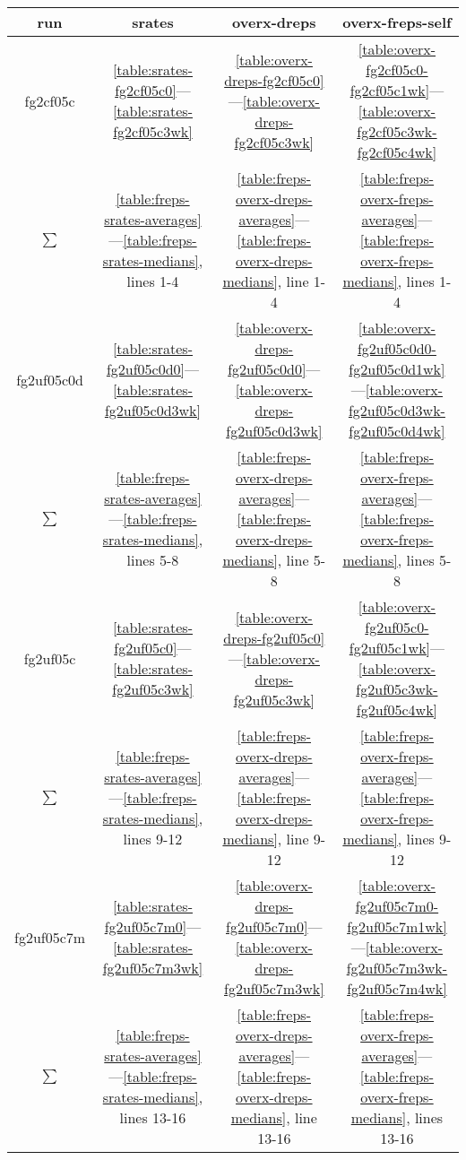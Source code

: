 \documentclass[10pt,oneside]{memoir}
\begin{document}
\begin{table}
\begin{tabular}{|cccc|}
\toprule
run & srates & overx-dreps & overx-freps-self  \\
\midrule
fg2cf05c & \ref{table:srates-fg2cf05c0}—\ref{table:srates-fg2cf05c3wk} & \ref{table:overx-dreps-fg2cf05c0}—\ref{table:overx-dreps-fg2cf05c3wk} & \ref{table:overx-fg2cf05c0-fg2cf05c1wk}—\ref{table:overx-fg2cf05c3wk-fg2cf05c4wk} \\
$\sum$ & \ref{table:freps-srates-averages}—\ref{table:freps-srates-medians}, lines 1-4 & \ref{table:freps-overx-dreps-averages}—\ref{table:freps-overx-dreps-medians}, line 1-4 & \ref{table:freps-overx-freps-averages}—\ref{table:freps-overx-freps-medians}, lines 1-4  \\
\hline
fg2uf05c0d & \ref{table:srates-fg2uf05c0d0}—\ref{table:srates-fg2uf05c0d3wk} & \ref{table:overx-dreps-fg2uf05c0d0}—\ref{table:overx-dreps-fg2uf05c0d3wk} & \ref{table:overx-fg2uf05c0d0-fg2uf05c0d1wk}—\ref{table:overx-fg2uf05c0d3wk-fg2uf05c0d4wk} \\
$\sum$ & \ref{table:freps-srates-averages}—\ref{table:freps-srates-medians}, lines 5-8 & \ref{table:freps-overx-dreps-averages}—\ref{table:freps-overx-dreps-medians}, line 5-8 & \ref{table:freps-overx-freps-averages}—\ref{table:freps-overx-freps-medians}, lines 5-8  \\
\hline
fg2uf05c & \ref{table:srates-fg2uf05c0}—\ref{table:srates-fg2uf05c3wk} & \ref{table:overx-dreps-fg2uf05c0}—\ref{table:overx-dreps-fg2uf05c3wk} & \ref{table:overx-fg2uf05c0-fg2uf05c1wk}—\ref{table:overx-fg2uf05c3wk-fg2uf05c4wk} \\
$\sum$ & \ref{table:freps-srates-averages}—\ref{table:freps-srates-medians}, lines 9-12 & \ref{table:freps-overx-dreps-averages}—\ref{table:freps-overx-dreps-medians}, line 9-12 & \ref{table:freps-overx-freps-averages}—\ref{table:freps-overx-freps-medians}, lines 9-12  \\
\hline
fg2uf05c7m & \ref{table:srates-fg2uf05c7m0}—\ref{table:srates-fg2uf05c7m3wk} & \ref{table:overx-dreps-fg2uf05c7m0}—\ref{table:overx-dreps-fg2uf05c7m3wk} & \ref{table:overx-fg2uf05c7m0-fg2uf05c7m1wk}—\ref{table:overx-fg2uf05c7m3wk-fg2uf05c7m4wk} \\
$\sum$ & \ref{table:freps-srates-averages}—\ref{table:freps-srates-medians}, lines 13-16 & \ref{table:freps-overx-dreps-averages}—\ref{table:freps-overx-dreps-medians}, line 13-16 & \ref{table:freps-overx-freps-averages}—\ref{table:freps-overx-freps-medians}, lines 13-16  \\

\end{tabular}
\end{table}
\end{document}
